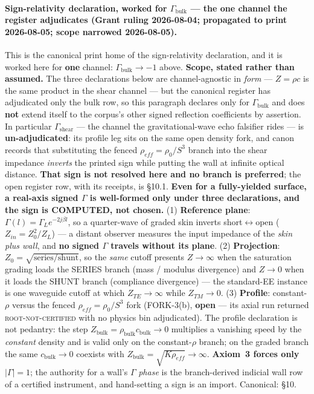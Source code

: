 \paragraph{Sign-relativity declaration, worked for $\Gamma_{\mathrm{bulk}}$ --- the one channel the register adjudicates (Grant ruling 2026-08-04; propagated to print 2026-08-05; scope narrowed 2026-08-05).}
\noindent This is the canonical print home of the sign-relativity declaration, and it is worked here for \textbf{one} channel: $\Gamma_{\mathrm{bulk}} \to -1$ above. \textbf{Scope, stated rather than assumed.} The three declarations below are channel-agnostic in \emph{form} --- $Z = \rho c$ is the same product in the shear channel --- but the canonical register has adjudicated only the bulk row, so this paragraph declares only for $\Gamma_{\mathrm{bulk}}$ and does \textbf{not} extend itself to the corpus's other signed reflection coefficients by assertion. In particular $\Gamma_{\mathrm{shear}}$ --- the channel the gravitational-wave echo falsifier rides --- is \textbf{un-adjudicated}: its profile leg sits on the same open density fork, and canon records that substituting the fenced $\rho_{eff} = \rho_0/S^3$ branch into the shear impedance \emph{inverts} the printed sign while putting the wall at infinite optical distance. \textbf{That sign is not resolved here and no branch is preferred}; the open register row, with its receipts, is  \S10.1. \textbf{Even for a fully-yielded surface, a real-axis signed $\Gamma$ is well-formed only under three declarations, and the sign is COMPUTED, not chosen.} (1) \textbf{Reference plane}: $\Gamma(l) = \Gamma_L e^{-2j\beta l}$, so a quarter-wave of graded skin inverts short$\leftrightarrow$open ($Z_{in} = Z_0^2/Z_L$) --- a distant observer measures the input impedance of the \emph{skin plus wall}, and \textbf{no signed $\Gamma$ travels without its plane}. (2) \textbf{Projection}: $Z_0 = \sqrt{\mathrm{series}/\mathrm{shunt}}$, so the \emph{same} cutoff presents $Z \to \infty$ when the saturation grading loads the SERIES branch (mass / modulus divergence) and $Z \to 0$ when it loads the SHUNT branch (compliance divergence) --- the standard-EE instance is one waveguide cutoff at which $Z_{TE} \to \infty$ while $Z_{TM} \to 0$. (3) \textbf{Profile}: constant-$\rho$ versus the fenced $\rho_{eff} = \rho_0/S^3$ fork (FORK-3(b), \textbf{open} --- its axial run returned \textsc{root-not-certified} with no physics bin adjudicated). The profile declaration is not pedantry: the step $Z_{\mathrm{bulk}} = \rho_{\mathrm{bulk}} c_{\mathrm{bulk}} \to 0$ multiplies a vanishing speed by the \emph{constant} density and is valid only on the constant-$\rho$ branch; on the graded branch the same $c_{\mathrm{bulk}} \to 0$ coexists with $Z_{\mathrm{bulk}} = \sqrt{K\rho_{eff}} \to \infty$. \textbf{Axiom~3 forces only $|\Gamma| = 1$\gammaundeclared{}}; the authority for a wall's $\Gamma$ \emph{phase} is the branch-derived indicial wall row of a certified instrument, and hand-setting a sign is an import. Canonical:  \S10.

